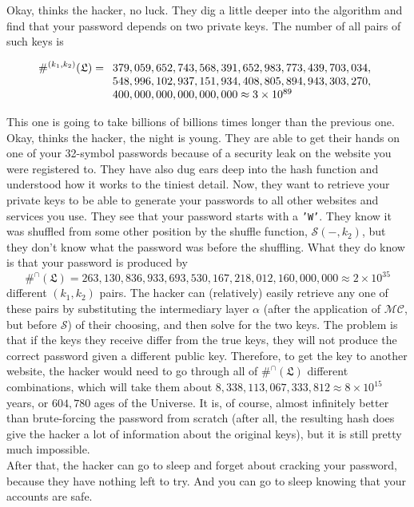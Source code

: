 \documentclass[12pt, a4paper]{article}
\newcommand{\C}{\mathcal{C}}
\renewcommand{\S}{\mathcal{S}}
\newcommand{\M}{\mathcal{M}}
\newcommand{\conf}{\mathfrak{L}}
\begin{document}
Okay, thinks the hacker, no luck. They dig a little deeper into the algorithm and find that your password depends on two private keys. The number of all pairs of such keys is

\[
\#^{(k_1,k_2)}(\conf) = \begin{array}[t]{l}
    379,059,652,743,568,391,652,983,773,439,703,034,\\
    548,996,102,937,151,934,408,805,894,943,303,270,\\
    400,000,000,000,000,000 \approx 3 \times 10^{89}
\end{array}
\]

This one is going to take billions of billions times longer than the previous one.\\

Okay, thinks the hacker, the night is young. They are able to get their hands on one of your 32-symbol passwords because of a security leak on the website you were registered to. They have also dug ears deep into the hash function and understood how it works to the tiniest detail. Now, they want to retrieve your private keys to be able to generate your passwords to all other websites and services you use. They see that your password starts with a \texttt{'W'}. They know it was shuffled from some other position by the shuffle function, $ \S(-, k_2) $, but they don't know what the password was before the shuffling. What they do know is that your password is produced by
\[ \#^{\cap}(\conf) = 263,130,836,933,693,530,167,218,012,160,000,000 \approx 2 \times 10^{35} \]
different $ (k_1, k_2) $ pairs. The hacker can (relatively) easily retrieve any one of these pairs by substituting the intermediary layer $ \alpha $ (after the application of $ \M\C $, but before $ \S $) of their choosing, and then solve for the two keys. The problem is that if the keys they receive differ from the true keys, they will not produce the correct password given a different public key. Therefore, to get the key to another website, the hacker would need to go through all of $ \#^{\cap}(\conf) $ different combinations, which will take them about $ 8,338,113,067,333,812 \approx 8 \times 10^{15} $ years, or $ 604,780 $ ages of the Universe. It is, of course, almost infinitely better than brute-forcing the password from scratch (after all, the resulting hash does give the hacker a lot of information about the original keys), but it is still pretty much impossible.\\

After that, the hacker can go to sleep and forget about cracking your password, because they have nothing left to try. And you can go to sleep knowing that your accounts are safe.
\end{document}
